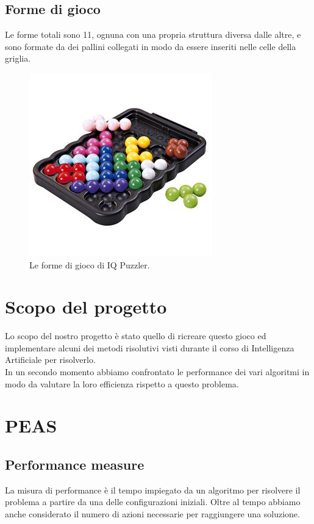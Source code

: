 \subsection{Forme di gioco}
Le forme totali sono 11, ognuna con una propria struttura diversa dalle altre, e sono formate da dei pallini collegati in modo da essere inseriti nelle celle della griglia.

\begin{figure}[h]
	\centering
	\includegraphics[scale=0.5]{immagini/iqpuzzler}
	\caption{Le forme di gioco di IQ Puzzler.}
	\label{fig:iqpuzzler}
\end{figure}



\section{Scopo del progetto}
Lo scopo del nostro progetto è stato quello di ricreare questo gioco ed implementare alcuni dei metodi risolutivi visti durante il corso di Intelligenza Artificiale per risolverlo. \\
In un secondo momento abbiamo confrontato le performance dei vari algoritmi in modo da valutare la loro efficienza rispetto a questo problema.

\section{PEAS}

\subsection{Performance measure}
La misura di performance è il tempo impiegato da un algoritmo per risolvere il problema a partire da una delle configurazioni iniziali. Oltre al tempo abbiamo anche considerato il numero di azioni necessarie per raggiungere una soluzione.

